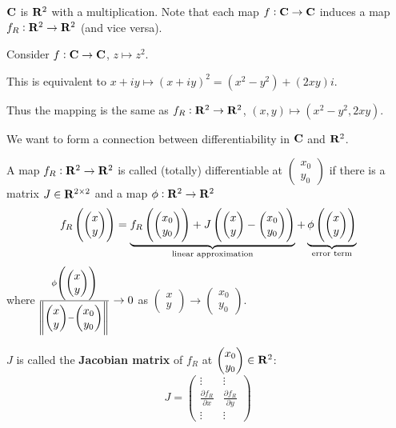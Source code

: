 $\mathbf C$ is $\mathbf R^2$ with a multiplication. Note that each map $f:\mathbf C\to\mathbf C$ induces a map $f_R:\mathbf R^2\to\mathbf R^2$ (and vice versa).
\begin{example}
Consider $f:\mathbf C\to\mathbf C$, $z\mapsto z^2$.

This is equivalent to $x+iy\mapsto (x+iy)^2=(x^2-y^2)+(2xy)i$.

Thus the mapping is the same as $f_R:\mathbf R^2\to\mathbf R^2$, $(x,y)\mapsto(x^2-y^2,2xy)$.
\end{example}
We want to form a connection between differentiability in $\mathbf C$ and $\mathbf R^2$.
\begin{definition}
A map $f_R:\mathbf R^2\to\mathbf R^2$ is called (totally) differentiable at $\begin{pmatrix}x_0\\ y_0\end{pmatrix}$ if there is a matrix $J\in\mathbf R^{2\times2}$ and a map $\phi:\mathbf R^2\to\mathbf R^2$
\[f_R\left(\begin{pmatrix}x\\y\end{pmatrix}\right)=\underbrace{f_R\left(\begin{pmatrix}x_0\\y_0\end{pmatrix}\right)+J\left(\begin{pmatrix}x\\y\end{pmatrix}-\begin{pmatrix}x_0\\ y_0\end{pmatrix}\right)}_{\text{linear approximation}}+\underbrace{\phi\left(\begin{pmatrix}x\\ y\end{pmatrix}\right)}_{\text{error term}}\]
where $\frac{\phi\left(\begin{pmatrix}x\\ y\end{pmatrix}\right)}{\norm{\begin{pmatrix}x\\y\end{pmatrix}-\begin{pmatrix}x_0\\ y_0\end{pmatrix}}}\to0$ as $\begin{pmatrix}x\\y\end{pmatrix}\to\begin{pmatrix}x_0\\ y_0\end{pmatrix}$.

$J$ is called the \textbf{Jacobian matrix} of $f_R$ at $\begin{pmatrix}x_0\\y_0\end{pmatrix}\in\mathbf R^2$:
\[J=\begin{pmatrix}
\vdots&\vdots\\
\frac{\partial f_R}{\partial x}&\frac{\partial f_R}{\partial y}\\
\vdots&\vdots
\end{pmatrix}\]
\end{definition}

